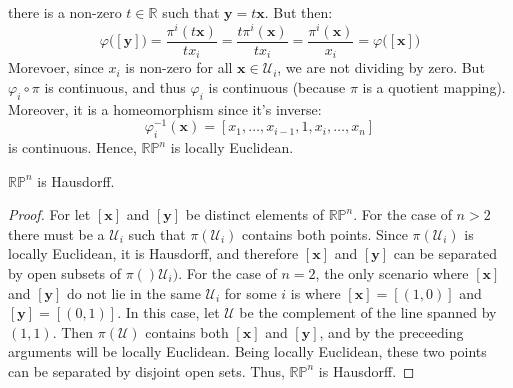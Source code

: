 \documentclass{article}                                                        %
\begin{document}
\begin{example}
            there is a non-zero $t\in\mathbb{R}$ such that
            $\mathbf{y}=t\mathbf{x}$. But then:
            \begin{equation}
                \varphi\big([\mathbf{y}]\big)=
                    \frac{\pi^{i}(t\mathbf{x})}{tx_{i}}
                    =\frac{t\pi^{i}(\mathbf{x})}{tx_{i}}
                    =\frac{\pi^{i}(\mathbf{x})}{x_{i}}
                    =\varphi\big([\mathbf{x}]\big)
            \end{equation}
            Morevoer, since $x_{i}$ is non-zero for all
            $\mathbf{x}\in\mathcal{U}_{i}$, we are not dividing by zero.
            But $\varphi_{i}\circ\pi$ is continuous, and thus $\varphi_{i}$ is
            continuous (because $\pi$ is a quotient mapping). Moreover, it is a
            homeomorphism since it's inverse:
            \begin{equation}
                \varphi_{i}^{\minus{1}}(\mathbf{x})=
                    [x_{1},\dots,x_{i-1},1,x_{i},\dots,x_{n}]
            \end{equation}
            is continuous. Hence, $\mathbb{RP}^{n}$ is locally Euclidean.
        \end{example}
        \begin{theorem}
            $\mathbb{RP}^{n}$ is Hausdorff.
        \end{theorem}
        \begin{proof}
            For let $[\mathbf{x}]$ and $[\mathbf{y}]$ be distinct elements of
            $\mathbb{RP}^{n}$. For the case of $n>2$ there must be a
            $\mathcal{U}_{i}$ such that $\pi(\mathcal{U}_{i})$ contains both
            points. Since $\pi(\mathcal{U}_{i})$ is locally Euclidean, it is
            Hausdorff, and therefore $[\mathbf{x}]$ and $[\mathbf{y}]$ can be
            separated by open subsets of $\pi()\mathcal{U}_{i})$. For the case
            of $n=2$, the only scenario where $[\mathbf{x}]$ and $[\mathbf{y}]$
            do not lie in the same $\mathcal{U}_{i}$ for some $i$ is where
            $[\mathbf{x}]=[(1,0)]$ and $[\mathbf{y}]=[(0,1)]$. In this case,
            let $\mathcal{U}$ be the complement of the line spanned by
            $(1,1)$. Then $\pi(\mathcal{U})$ contains both $[\mathbf{x}]$ and
            $[\mathbf{y}]$, and by the preceeding arguments will be locally
            Euclidean. Being locally Euclidean, these two points can be
            separated by disjoint open sets. Thus, $\mathbb{RP}^{n}$ is
            Hausdorff.
        \end{proof}
\end{document}
